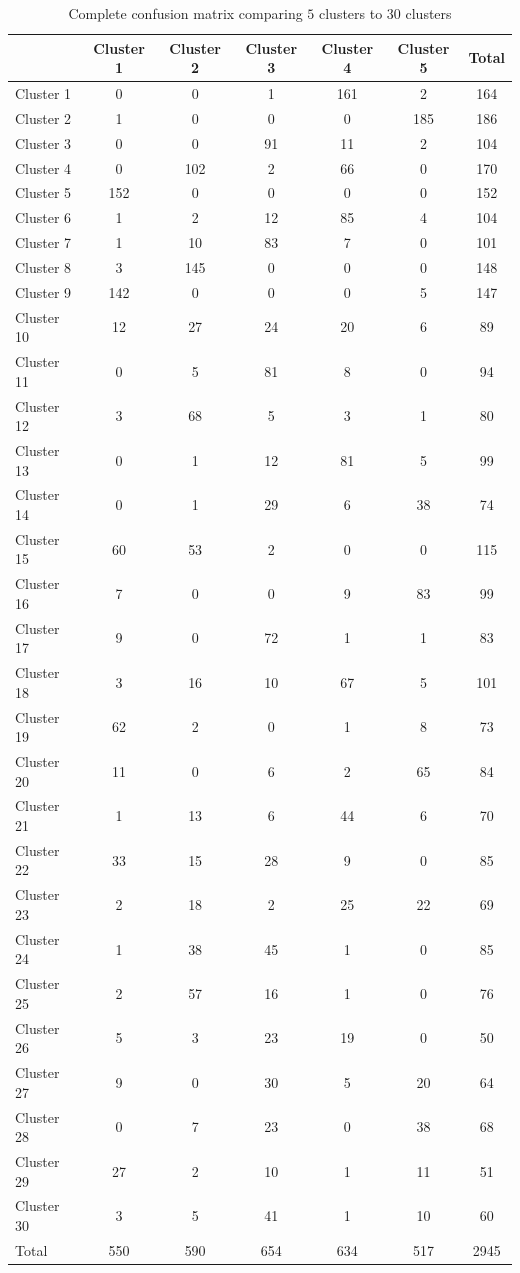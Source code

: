 \documentclass[12pt]{article}
\begin{document}
\begin{table}
\caption{\label{table:confusion-complete} Complete confusion matrix comparing $5$ clusters to $30$ clusters }
\begin{tabular}{lccccc|c}
  \hline
 & Cluster 1 & Cluster 2 & Cluster 3 & Cluster 4 & Cluster 5 & Total \\ 
  \hline
  Cluster 1 & 0 & 0 & 1 & 161 & 2 & 164 \\ 
  Cluster 2 & 1 & 0 & 0 & 0 & 185 & 186 \\ 
  Cluster 3 & 0 & 0 & 91 & 11 & 2 & 104 \\ 
  Cluster 4 & 0 & 102 & 2 & 66 & 0 & 170 \\ 
  Cluster 5 & 152 & 0 & 0 & 0 & 0 & 152 \\ 
  Cluster 6 & 1 & 2 & 12 & 85 & 4 & 104 \\ 
  Cluster 7 & 1 & 10 & 83 & 7 & 0 & 101 \\ 
  Cluster 8 & 3 & 145 & 0 & 0 & 0 & 148 \\ 
  Cluster 9 & 142 & 0 & 0 & 0 & 5 & 147 \\ 
  Cluster 10 & 12 & 27 & 24 & 20 & 6 & 89 \\ 
  Cluster 11 & 0 & 5 & 81 & 8 & 0 & 94 \\ 
  Cluster 12 & 3 & 68 & 5 & 3 & 1 & 80 \\ 
  Cluster 13 & 0 & 1 & 12 & 81 & 5 & 99 \\ 
  Cluster 14 & 0 & 1 & 29 & 6 & 38 & 74 \\ 
  Cluster 15 & 60 & 53 & 2 & 0 & 0 & 115 \\ 
  Cluster 16 & 7 & 0 & 0 & 9 & 83 & 99 \\ 
  Cluster 17 & 9 & 0 & 72 & 1 & 1 & 83 \\ 
  Cluster 18 & 3 & 16 & 10 & 67 & 5 & 101 \\ 
  Cluster 19 & 62 & 2 & 0 & 1 & 8 & 73 \\ 
  Cluster 20 & 11 & 0 & 6 & 2 & 65 & 84 \\ 
  Cluster 21 & 1 & 13 & 6 & 44 & 6 & 70 \\ 
  Cluster 22 & 33 & 15 & 28 & 9 & 0 & 85 \\ 
  Cluster 23 & 2 & 18 & 2 & 25 & 22 & 69 \\ 
  Cluster 24 & 1 & 38 & 45 & 1 & 0 & 85 \\ 
  Cluster 25 & 2 & 57 & 16 & 1 & 0 & 76 \\ 
  Cluster 26 & 5 & 3 & 23 & 19 & 0 & 50 \\ 
  Cluster 27 & 9 & 0 & 30 & 5 & 20 & 64 \\ 
  Cluster 28 & 0 & 7 & 23 & 0 & 38 & 68 \\ 
  Cluster 29 & 27 & 2 & 10 & 1 & 11 & 51 \\ 
  Cluster 30 & 3 & 5 & 41 & 1 & 10 & 60 \\ \hline
  Total & 550 & 590 & 654 & 634 & 517 & 2945 \\ \hline
\end{tabular}
\end{table}

\clearpage



\end{document}
